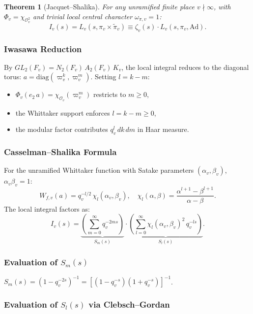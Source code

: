 \documentclass[12pt]{article}
\newtheorem{theorem}{Theorem}[section]
\begin{document}
\begin{theorem}[Jacquet--Shalika]\label{thm:local}
For any unramified finite place $v \nmid \infty$, with $\Phi_v = \chi_{\mathcal{O}_v^2}$
and trivial local central character $\omega_{\pi,v} = 1$:
\begin{equation}\label{eq:local-factor}
  I_v(s) = L_v(s, \pi_v \times \tilde\pi_v)
  \equiv \zeta_v(s) \cdot L_v(s, \pi_v, \mathrm{Ad}).
\end{equation}
\end{theorem}

\subsubsection*{Iwasawa Reduction}

By $GL_2(F_v) = N_2(F_v)\, A_2(F_v)\, K_v$, the local integral reduces to the diagonal
torus: $a = \mathrm{diag}(\varpi_v^k, \varpi_v^m)$. Setting $l = k - m$:
\begin{itemize}
  \item $\Phi_v(e_2\, a) = \chi_{\mathcal{O}_v}(\varpi_v^m)$ restricts to $m \geq 0$,
  \item the Whittaker support enforces $l = k - m \geq 0$,
  \item the modular factor contributes $q_v^l\, dk\, dm$ in Haar measure.
\end{itemize}

\subsubsection*{Casselman--Shalika Formula}

For the unramified Whittaker function with Satake parameters $(\alpha_v,\beta_v)$,
$\alpha_v\beta_v = 1$:
\[
  W_{f,v}(a) = q_v^{-l/2}\, \chi_l(\alpha_v,\beta_v),
  \quad
  \chi_l(\alpha,\beta) = \frac{\alpha^{l+1}-\beta^{l+1}}{\alpha-\beta}.
\]
The local integral factors as:
\[
  I_v(s) = \underbrace{\left(\sum_{m=0}^\infty q_v^{-2ms}\right)}_{S_m(s)}
  \cdot
  \underbrace{\left(\sum_{l=0}^\infty \chi_l(\alpha_v,\beta_v)^2\, q_v^{-ls}\right)}_{S_l(s)}.
\]

\subsubsection*{Evaluation of $S_m(s)$}

$S_m(s) = (1-q_v^{-2s})^{-1} = [(1-q_v^{-s})(1+q_v^{-s})]^{-1}$.

\subsubsection*{Evaluation of $S_l(s)$ via Clebsch--Gordan}
\end{document}
